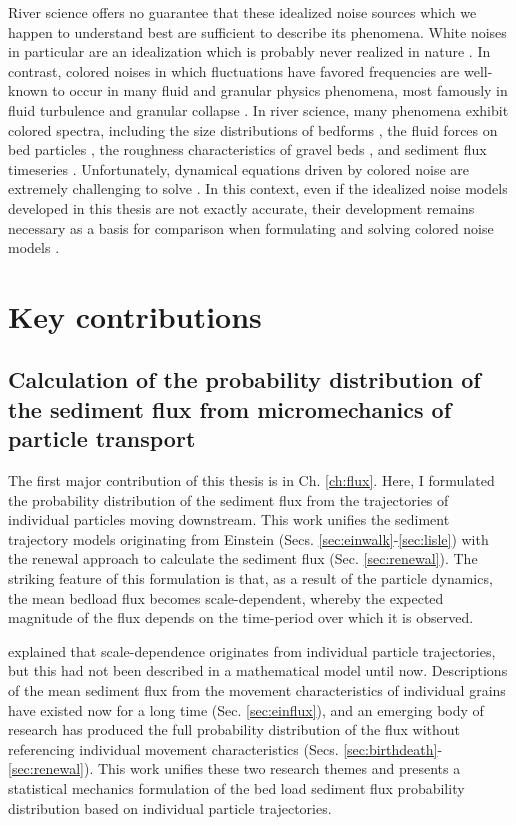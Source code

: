 River science offers no guarantee that these idealized noise sources which we happen to understand best are sufficient to describe its phenomena.
White noises in particular are an idealization which is probably never realized in nature \citep{Gardiner1983,Kubo1978}.
In contrast, colored noises in which fluctuations have favored frequencies are well-known to occur in many fluid and granular physics phenomena, most famously in fluid turbulence \citep{Kolmogorov1941,Nikora2000} and granular collapse \citep{Bak1987,Jensen1998}.
In river science, many phenomena exhibit colored spectra, including the size distributions of bedforms \citep{Nikora1997,Guala2014}, the fluid forces on bed particles \citep{Dwivedi2011, Amir2014}, the roughness characteristics of gravel beds \citep{Aberle2006,Singh2012}, and sediment flux timeseries \citep{Dhont2018,Chartrand2021}.
Unfortunately, dynamical equations driven by colored noise are extremely challenging to solve \citep{Hanggi1978,Luczka2005,Hanggi2007}.
In this context, even if the idealized noise models developed in this thesis are not exactly accurate, their development remains necessary as a basis for comparison when formulating and solving colored noise models \citep[e.g.][]{Fox1986,Moss1989}.

\section{Key contributions}

\subsection{Calculation of the probability distribution of the sediment flux from micromechanics of particle transport}

The first major contribution of this thesis is in Ch. \ref{ch:flux}. Here, I formulated the probability distribution of the sediment flux from the trajectories of individual particles moving downstream. This work unifies the sediment trajectory models originating from Einstein (Secs. \ref{sec:einwalk}-\ref{sec:lisle}) with the renewal approach to calculate the sediment flux (Sec. \ref{sec:renewal}).
The striking feature of this formulation is that, as a result of the particle dynamics, the mean bedload flux becomes scale-dependent, whereby the expected magnitude of the flux depends on the time-period over which it is observed.

\citet{Ballio2018} explained that scale-dependence originates from individual particle trajectories, but this had not been described in a mathematical model until now.
Descriptions of the mean sediment flux from the movement characteristics of individual grains have existed now for a long time (Sec. \ref{sec:einflux}), and an emerging body of research has produced the full probability distribution of the flux without referencing individual movement characteristics (Secs. \ref{sec:birthdeath}-\ref{sec:renewal}). 
This work unifies these two research themes and presents a statistical mechanics formulation of the bed load sediment flux probability distribution based on individual particle trajectories.

